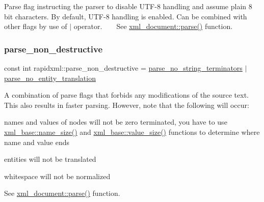 Parse flag instructing the parser to disable U\+T\+F-\/8 handling and assume plain 8 bit characters. By default, U\+T\+F-\/8 handling is enabled. Can be combined with other flags by use of $\vert$ operator. ~\newline
~\newline
 See \mbox{\hyperlink{classrapidxml_1_1xml__document_ac6e73ff9ac323bf5a370c38feb03a6b1}{xml\+\_\+document\+::parse()}} function. \mbox{\label{namespacerapidxml_a45d4d8fef551beaaba23a83b847fd6a3}} 
\subsubsection{\texorpdfstring{parse\+\_\+non\+\_\+destructive}{parse\_non\_destructive}}
{\footnotesize\ttfamily const int rapidxml\+::parse\+\_\+non\+\_\+destructive = \mbox{\hyperlink{namespacerapidxml_af3fc88ba6bee33482a2db81b1da36ea1}{parse\+\_\+no\+\_\+string\+\_\+terminators}} $\vert$ \mbox{\hyperlink{namespacerapidxml_a89113c103ffaf77615d1aa330c8dcca8}{parse\+\_\+no\+\_\+entity\+\_\+translation}}}

A combination of parse flags that forbids any modifications of the source text. This also results in faster parsing. However, note that the following will occur\+: 
\begin{DoxyItemize}
\item names and values of nodes will not be zero terminated, you have to use \mbox{\hyperlink{classrapidxml_1_1xml__base_a20c8ffbe0c7a0b4231681ab8b99330a4}{xml\+\_\+base\+::name\+\_\+size()}} and \mbox{\hyperlink{classrapidxml_1_1xml__base_a2eb123d471b1567fa4832b6ee2b75493}{xml\+\_\+base\+::value\+\_\+size()}} functions to determine where name and value ends 
\item entities will not be translated 
\item whitespace will not be normalized 
\end{DoxyItemize}See \mbox{\hyperlink{classrapidxml_1_1xml__document_ac6e73ff9ac323bf5a370c38feb03a6b1}{xml\+\_\+document\+::parse()}} function. \mbox{\label{namespacerapidxml_a31f33885defb5176a7d99e524c35d386}} 
